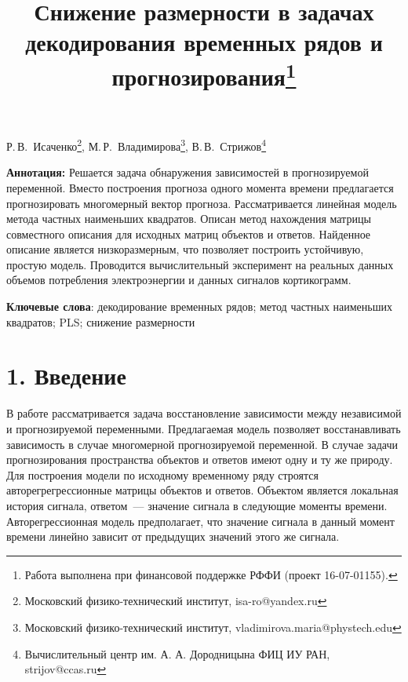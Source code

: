 \documentclass[12pt,twoside]{article}
\begin{document}
	\title
	{Снижение размерности в задачах декодирования временных рядов и прогнозирования\thanks{Работа выполнена при финансовой поддержке РФФИ (проект 16-07-01155).}}
	\date{}
	\maketitle
	\begin{center}
		Р.\,В.~Исаченко\footnote{Московский физико-технический институт, isa-ro@yandex.ru},
		М.\,Р.~Владимирова\footnote{Московский физико-технический институт, vladimirova.maria@phystech.edu},
		В.\,В.~Стрижов\footnote{Вычислительный центр им. А. А. Дородницына ФИЦ ИУ РАН, strijov@ccas.ru}
	\end{center}
	\textbf{Аннотация:} Решается задача обнаружения зависимостей в прогнозируемой переменной. 
	Вместо построения прогноза одного момента времени предлагается прогнозировать многомерный вектор прогноза.
	Рассматривается линейная модель метода частных наименьших квадратов. 
	Описан метод нахождения матрицы совместного описания для исходных матриц объектов и ответов. 
	Найденное описание является низкоразмерным, что позволяет построить устойчивую, простую модель.
	Проводится вычислительный эксперимент на реальных данных объемов потребления электроэнергии и данных сигналов кортикограмм.
	
	\bigskip
	\textbf{Ключевые слова}: декодирование временных рядов; метод частных наименьших квадратов; PLS; снижение размерности

\linenumbers
\section{1. Введение}

В работе рассматривается задача восстановление зависимости между независимой и прогнозируемой переменными.
Предлагаемая модель позволяет восстанавливать зависимость в случае многомерной прогнозируемой переменной. 
В случае задачи прогнозирования пространства объектов и ответов имеют одну и ту же природу.
Для построения модели по исходному временному ряду строятся авторегрегрессионные матрицы объектов и ответов. 
Объектом является локальная история сигнала, ответом~--- значение сигнала в следующие моменты времени.
Авторегрессионная модель предполагает, что значение сигнала в данный момент времени линейно зависит от предыдущих значений этого же сигнала.   
\end{document}
